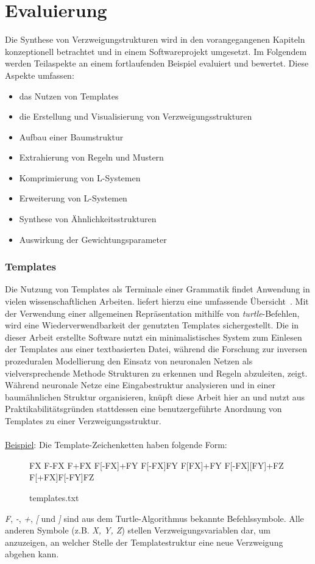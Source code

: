 
\chapter{Evaluierung}
\label{eval}
Die Synthese von Verzweigungstrukturen wird in den vorangegangenen Kapiteln konzeptionell betrachtet
und in einem Softwareprojekt umgesetzt.
Im Folgendem werden Teilaspekte an einem fortlaufenden Beispiel evaluiert und bewertet.
Diese Aspekte umfassen:
\begin{itemize}
    \item das Nutzen von Templates
    \item die Erstellung und Visualisierung von Verzweigungsstrukturen
    \item Aufbau einer Baumstruktur
    \item Extrahierung von Regeln und Mustern
    \item Komprimierung von L-Systemen
    \item Erweiterung von L-Systemen
    \item Synthese von Ähnlichkeitsstrukturen
    \item Auswirkung der Gewichtungsparameter
\end{itemize}

\subsection*{Templates}
Die Nutzung von Templates als Terminale einer Grammatik findet Anwendung in vielen wissenschaftlichen Arbeiten.
\citeauthor{aliaga_2016} liefert hierzu eine umfassende Übersicht~\cite{aliaga_2016}.
Mit der Verwendung einer allgemeinen Repräsentation mithilfe von \textit{turtle}-Befehlen, wird eine
Wiederverwendbarkeit der genutzten Templates sichergestellt.
Die in dieser Arbeit erstellte Software nutzt ein minimalistisches System zum Einlesen der Templates aus
einer textbasierten Datei, während die Forschung zur inversen prozeduralen Modellierung den Einsatz von
neuronalen Netzen als vielversprechende Methode Strukturen zu erkennen und Regeln abzuleiten, zeigt.\\
Während neuronale Netze eine Eingabestruktur analysieren und in einer baumähnlichen Struktur organisieren,
knüpft diese Arbeit hier an und nutzt aus Praktikabilitätsgründen stattdessen eine benutzergeführte Anordnung
von Templates zu einer Verzweigungsstruktur.\\~\\
\underline{Beispiel}: Die Template-Zeichenketten haben folgende Form:
\begin{figure}[H]
    \centering
    \begin{csource}
    FX
    F-FX
    F+FX
    F[-FX]+FY
    F[-FX]FY
    F[FX]+FY
    F[-FX][FY]+FZ
    F[+FX]F[-FY]FZ
    \end{csource}
    \caption{templates.txt}
\end{figure}
\textit{F}, \textit{-}, \textit{+}, \textit{[} und \textit{]} sind aus dem Turtle-Algorithmus bekannte
Befehlssymbole.
Alle anderen Symbole (z.B. \textit{X, Y, Z}) stellen Verzweigungsvariablen dar, um anzuzeigen, an welcher Stelle
der Templatestruktur eine neue Verzweigung abgehen kann.

